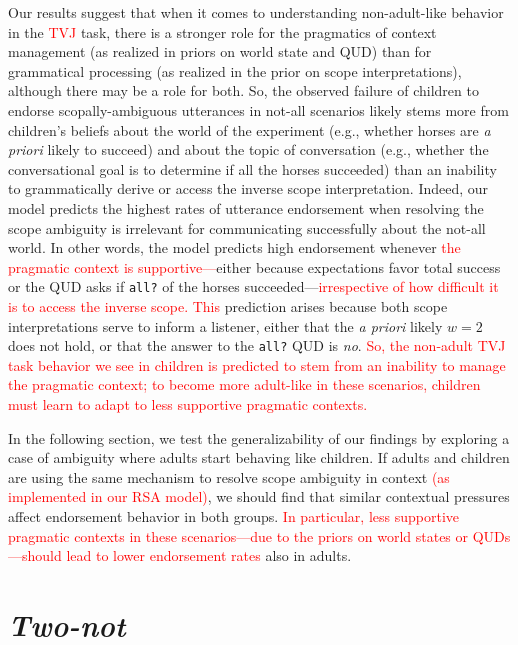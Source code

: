 \documentclass[preprint,authoryear]{elsarticle}\frenchspacing
\newcommand{\lp}[1]{\textcolor{red}{#1}} %
\begin{document}
Our results suggest that when it comes to understanding non-adult-like behavior in the 
\lp{TVJ}
task, there is a stronger role for the pragmatics of context management (as realized in priors on world state and QUD) than for grammatical processing (as realized in the prior on scope interpretations), although there may be a role for both. So, the observed failure of children to endorse scopally-ambiguous utterances in not-all scenarios likely stems more from children's beliefs about the world of the experiment (e.g., whether horses are \emph{a priori} likely to succeed) and about the topic of conversation (e.g., whether the conversational goal is to determine if all the horses succeeded) than an inability to grammatically derive or access the inverse scope interpretation. Indeed, our model predicts the highest rates of utterance endorsement when 
resolving the scope ambiguity is irrelevant for communicating successfully about the not-all world. In other words, the model predicts high endorsement whenever
\lp{the pragmatic context is supportive---}either because expectations favor total success or 
the QUD asks if \texttt{all?} of the horses succeeded---\lp{irrespective of how difficult it is to access the inverse scope.}
%
\lp{This} prediction arises because
both scope interpretations serve to inform a listener, either that the \emph{a priori} likely $w=2$ does not hold, or that the answer to the \texttt{all?} QUD is \emph{no}. 
\lp{So, the non-adult TVJ task behavior we see in children is predicted to stem from an inability to manage the pragmatic context; to become more adult-like in these scenarios, children must learn to adapt to less supportive pragmatic contexts.}

In the following section, we test the generalizability of our findings by exploring a case of ambiguity where adults start behaving like children.
If adults and children are using the same mechanism to resolve scope ambiguity in context \lp{(as implemented in our RSA model)}, we should find that similar contextual pressures affect endorsement behavior in both groups.
\lp{In particular, less supportive pragmatic contexts in these scenarios---due to the priors on world states or QUDs---should lead to lower endorsement rates} also in adults.



\section{\emph{Two-not}} \label{two-not-model}
\end{document}
